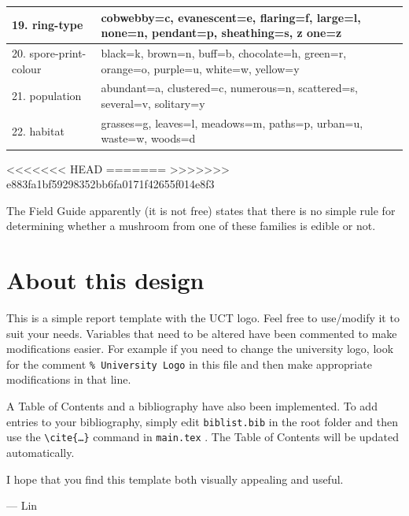 \documentclass[12pt]{book}
\begin{document}
\begin{center}
\begin{tabularx}{\linewidth}{ |l|X| }
 \hline
 19. ring-type & cobwebby=c, evanescent=e, flaring=f, large=l, none=n, pendant=p, sheathing=s, z one=z \\
 \hline
 20. spore-print-colour & black=k, brown=n, buff=b, chocolate=h, green=r, orange=o, purple=u, white=w, yellow=y \\
 \hline
 21. population & abundant=a, clustered=c, numerous=n, scattered=s, several=v, solitary=y \\ \hline 22. habitat & grasses=g, leaves=l, meadows=m, paths=p, urban=u, waste=w, woods=d \\
\hline
\end{tabularx}
<<<<<<< HEAD
=======
>>>>>>> e883fa1bf59298352bb6fa0171f42655f014e8f3
\end{center}




The Field Guide apparently (it is not free) states that there is no simple rule for determining whether a mushroom from one of these families is edible or not.

\section{About this design}
This is a simple report template with the UCT logo. Feel free to use/modify it to suit your needs. Variables that need to be altered have been commented to make modifications easier. For example if you need to change the university logo, look for the comment \texttt{\% University Logo} in this file and then make appropriate modifications in that line.

A Table of Contents and a bibliography have also been implemented. To add entries to your bibliography, simply edit \texttt{biblist.bib} in the root folder and then use the \texttt{\textbackslash cite\{\ldots\}} command in \texttt{main.tex} \cite{bibtex}. The Table of Contents will be updated automatically.

I hope that you find this template both visually appealing and useful.

\hspace{1 cm}--- Lin

\newpage


\end{document}
